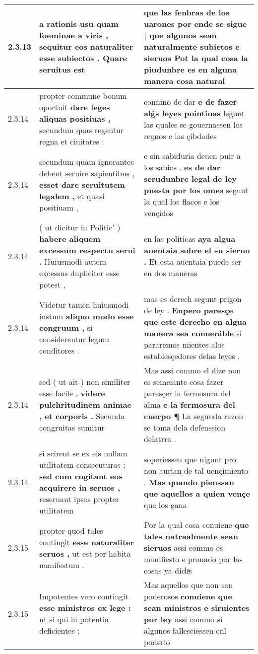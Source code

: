 \begin{tabular}{|p{1cm}|p{6.5cm}|p{6.5cm}|}
2.3.13 & a rationis usu quam foeminae a viris , \textbf{ sequitur eos naturaliter esse subiectos . } Quare seruitus est & que las fenbras de los uarones \textbf{ por ende se sigue | que algunos sean naturalmente subietos e sieruos } Pot la qual cosa la piudunbre es en alguna manera cosa natural \\\hline
2.3.14 & propter commune bonum oportuit \textbf{ dare leges aliquas positiuas , } secundum quas regentur regna et ciuitates : & connino de dar \textbf{ e de fazer alg̃s leyes pointiuas } legunt las quales se gouernassen los regnos e las çibdades \\\hline
2.3.14 & secundum quam ignorantes debent seruire sapientibus , \textbf{ esset dare seruitutem legalem , } et quasi positiuam , & e sin sabiduria deuen puir a los sabios . \textbf{ es de dar serudunbre legal de ley puesta por los omes } segunt la qual los flacos e los vençidos \\\hline
2.3.14 & ( ut dicitur in Politic’ ) \textbf{ habere aliquem excessum respectu serui . } Huiusmodi autem excessus dupliciter esse potest , & en las politicas \textbf{ aya algua auentaia sobre el su sieruo . } Et esta auentaia puede ser en dos maneras \\\hline
2.3.14 & Videtur tamen huiusmodi iustum \textbf{ aliquo modo esse congruum , } si considerentur legum conditores . & mas es derech segunt prigon de ley . \textbf{ Enpero paresçe que este derecho en algua manera sea conuenible } si pararemos mientes alos establesçedores delas leyes . \\\hline
2.3.14 & sed ( ut ait ) non similiter esse facile , \textbf{ videre pulchritudinem animae , et corporis . } Secunda congruitas sumitur & Mas assi commo el dize non es semeiante cosa fazer paresçer la fermosura del alma \textbf{ e la fermosura del cuerpo ¶ } La segunda razon se toma dela defenssion delatrra . \\\hline
2.3.14 & si scirent se ex eis nullam utilitatem consecuturos ; \textbf{ sed cum cogitant eos acquirere in seruos , } reseruant ipsos propter utilitatem & soperiessen que nigunt pro non aurian de tal uençimiento . \textbf{ Mas quando pienssan que aquellos a quien vençe } que los gana \\\hline
2.3.15 & propter quod tales contingit \textbf{ esse naturaliter seruos , } ut est per habita manifestum . & Por la qual cosa conuiene \textbf{ que tales natraalmente sean sieruos } assi commo es manifiesto e prouado por las cosas ya dichͣs \\\hline
2.3.15 & Impotentes vero contingit \textbf{ esse ministros ex lege : } ut si qui in potentia deficientes ; & Mas aquellos que non son poderosos \textbf{ conuiene que sean ministros e siruientes por ley } assi commo si algunos fallesciessen enl poderio \\\hline

\end{tabular}
